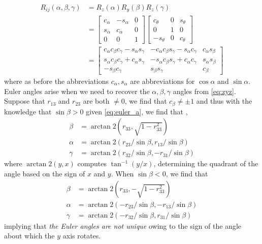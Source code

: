 \begin{align}
	R_{ij}(\alpha, \beta, \gamma) &= R_z(\alpha) R_y(\beta) R_z(\gamma) \\
	& = \begin{bmatrix}
	c_\alpha & -s_\alpha & 0 \\
	s_\alpha & c_\alpha & 0 \\
	0 & 0 & 1
	\end{bmatrix}
	\begin{bmatrix}
	c_\theta  & 0 & s_\theta\\
	0  & 1 & 0 \\
	-s_\theta  & 0 & c_\theta 
	\end{bmatrix} \nonumber \\
	&= \begin{bmatrix}
	c_\alpha c_\beta c_\gamma - s_\alpha s_\gamma & -c_\alpha c_\beta s_\gamma - s_\alpha c_\gamma & c_\alpha s_\beta \\
	s_\alpha c_\beta c_\gamma + c_\alpha s_\gamma & -s_\alpha c_\beta s_\gamma + c_\alpha c_\gamma  & s_\alpha s_\beta \\
	-s_\beta c_\gamma & s_\beta s_\gamma & c_\beta
	\end{bmatrix} 
	\label{eq:zyz}
\end{align}
%
where as before the abbreviations $c_\alpha, s_\alpha$ are abbreviations for $\cos \alpha$ and $\sin \alpha$. Euler angles arise when we need to recover the $\alpha, \beta, \gamma$ angles from \eqref{eq:zyz}. Suppose that $r_{13}$ and $r_{23}$ are both  $\neq 0$, we find that $c_\beta \neq \pm 1$ and thus with the knowledge that $\sin \beta >0$ given \eqref{eq:euler_a}, we find that , 
%
\begin{subequations}
\begin{align}
\beta &= \arctan 2(r_{33}, \sqrt{1 - r_{33}^2})  \label{eq:euler_a}\\
\alpha &= \arctan 2(r_{23}/\sin \beta, r_{13}/\sin \beta) \label{eq:euler_b} \\
\gamma &= \arctan 2 (r_{32}/\sin \beta, -r_{31}/\sin \beta)
\end{align}
\label{eq:euler}
\end{subequations}
%
where $\arctan2(y, x)$ computes $\tan^{-1}(y/x)$, determining the quadrant of the angle based on the sign of $x$ and $y$.
%
When $\sin \beta < 0$, we find that 
%
\begin{subequations}
	\begin{align}
	\beta &=  \arctan2(r_{33}, -\sqrt{1 - r_{33}^2})  \label{eq:euler_neg_a}\\
	\alpha &= \arctan 2(-r_{23}/\sin \beta, -r_{13}/\sin \beta) \label{eq:euler_neg_b} \\
	\gamma &= \arctan 2 (-r_{32}/\sin \beta, r_{31}/\sin \beta)
	\end{align}
	\label{eq:euler_neg}
\end{subequations}
%
implying that \textit{the Euler angles are not unique} owing to the sign of the angle about which the $y$ axis rotates. 

